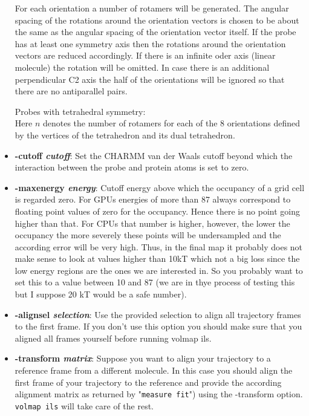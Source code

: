 \begin{itemize}
    For each orientation a number of rotamers will be
    generated. The angular spacing of the rotations
    around the orientation vectors is chosen to be about
    the same as the angular spacing of the orientation
    vector itself.
    If the probe has at least one symmetry axis then the 
    rotations around the orientation vectors are reduced
    accordingly. If there is an infinite oder axis (linear
    molecule) the rotation will be omitted.
    In case there is an additional perpendicular C2 axis
    the half of the orientations will be ignored so that
    there are no antiparallel pairs.
    
    Probes with tetrahedral symmetry:\\ 
    Here $n$ denotes the number of rotamers for each of
    the 8 orientations defined by the vertices of the 
    tetrahedron and its dual tetrahedron.

  \item {\bf -cutoff {\it cutoff}}: Set the CHARMM van der Waals cutoff beyond
    which the interaction between the probe and protein atoms is set to zero.

  \item {\bf -maxenergy {\it energy}}: Cutoff energy above which the
    occupancy of a grid cell is regarded zero. For GPUs energies of
    more than 87 always correspond to floating point values of zero
    for the occupancy. Hence there is no point going higher than
    that. For CPUs that number is higher, however, the lower the
    occupancy the more severely these points will be undersampled and
    the according error will be very high. Thus, in the final map it
    probably does not make sense to look at values higher than 10kT
    which not a big loss since the low energy regions are the ones we
    are interested in. So you probably want to set this to a value
    between 10 and 87 (we are in thye process of testing this but I
    suppose 20 kT would be a safe number).

  \item {\bf -alignsel {\it selection}}:
    Use the provided selection to align all trajectory frames to the first
    frame. If you don't use this option you should make sure that you aligned
    all frames yourself before running volmap ils.
    
  \item {\bf -transform {\it matrix}}:
    Suppose you want to align your trajectory to a reference frame
    from a different molecule. In this case you should align the
    first frame of your trajectory to the reference and provide the
    according alignment matrix as returned by "{\tt measure fit}")
    using the -transform option. {\tt volmap ils} will take care
    of the rest.


\end{itemize}
